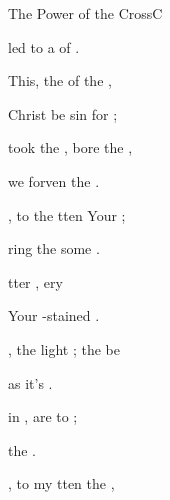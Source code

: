 \begin{song}{The Power of the Cross}{C}
\begin{SBExtraKeys}
{\begin{SBVerse}
        led to a  of .

    \end{SBVerse}

    \begin{SBChorus}

        This, the  of the ,

        Christ be sin for ;

        took the , bore the ,

        we  forven  the . 
            \Ch{[Em}{}  \Ch{C]}{}

    \end{SBChorus}

    \begin{SBVerse}
        
        , to  the  
            tten  Your ; 

        ring the some
              .

         tter , 
            ery  

         Your -stained .

    \end{SBVerse}

    \begin{SBVerse}
        
        , the light ; 
             the  be

         as it's 
              .

          in , 
             are  to ;

         the  .

    \end{SBVerse}

    \begin{SBVerse}
        
        , to  my  
            tten  the , 


\end{SBVerse}}
\end{SBExtraKeys}
\end{song}
